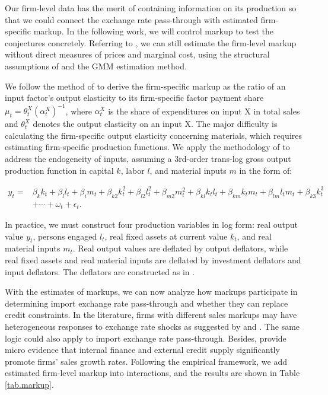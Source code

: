 \documentclass[12pt]{article}
\begin{document}
Our firm-level data has the merit of containing information on its production so that we could connect the exchange rate pass-through with estimated firm-specific markup. In the following work, we will control markup to test the conjectures concretely. Referring to \cite{bkl2021}, we can still estimate the firm-level markup without direct measures of prices and marginal cost, using the structural assumptions of \cite{dlw2012} and the GMM estimation method.

We follow the method of \cite{dlw2012}  to derive the firm-specific markup as the ratio of an input factor's output elasticity to its firm-specific factor payment share $\mu_{t}=\theta_{t}^{X}\left(\alpha_{t}^{X}\right)^{-1}$, where $\alpha_{t}^{X}$ is the share of expenditures on input X in total sales and $\theta^X_t$ denotes the output elasticity on an input X. The major difficulty is calculating the firm-specific output elasticity concerning materials, which requires estimating firm-specific production functions. We apply the methodology of \cite{acf2015} to address the endogeneity of inputs, assuming a 3rd-order trans-log gross output production function in capital $k$, labor $l$, and material inputs $m$ in the form of:

$$
\begin{aligned}
	y_{t}= &\beta_{k} k_{t}+\beta_{l} l_{t}+\beta_{i} m_{t}+\beta_{k 2} k_{t}^{2}+\beta_{l 2} l_{t}^{2}+\beta_{m 2} m_{t}^{2}+\beta_{k l} k_{ t} l_{t}+\beta_{k m} k_{t} m_{t}+\beta_{l m} l_{t} m_{t}+\beta_{k 3} k_{t}^{3}\\
	&+\cdots+\omega_{t}+\epsilon_{t}.
\end{aligned}
$$

In practice, we must construct four production variables in log form: real output value $y_t$, persons engaged $l_t$, real fixed assets at current value $k_t$, and real material inputs $m_t$. Real output values are deflated by output deflators, while real fixed assets and real material inputs are deflated by investment deflators and input deflators. The deflators are constructed as in \cite{brandt2012}.

With the estimates of markups, we can now analyze how markups participate in determining import exchange rate pass-through and whether they can replace credit constraints. In the literature, firms with different sales markups may have heterogeneous responses to exchange rate shocks as suggested by \cite{bmm2012} and \cite{lmx2015}. The same logic could also apply to import exchange rate pass-through. Besides, \cite{llz2018} provide micro evidence that internal finance and external credit supply significantly promote firms' sales growth rates. Following the empirical framework, we add estimated firm-level markup into interactions, and the results are shown in Table \ref{tab.markup}.
\end{document}
